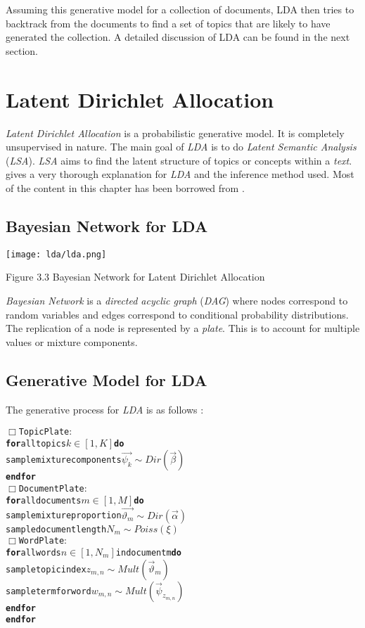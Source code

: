 Assuming this generative model for a collection of documents, LDA then tries to backtrack from the documents to find a set of 
topics that are likely to have generated the collection. A detailed discussion of LDA can be found in the next section.

\section{Latent Dirichlet Allocation}

\par

\textit{Latent Dirichlet Allocation} is a probabilistic generative model. It is completely unsupervised in nature. The main goal of 
\textit{LDA} is to do \textit{Latent Semantic Analysis} (\textit{LSA}). \textit{LSA} aims to find the latent structure of topics or 
concepts within a \textit{text}. \citep*{heinrich2005parameter} gives a very thorough explanation for \textit{LDA} and the inference 
method used. Most of the content in this chapter has been borrowed from \citep*{heinrich2005parameter}.

\subsection{Bayesian Network for LDA}

\texttt{[image: lda/lda.png]} 
\begin{center}
 Figure 3.3 Bayesian Network for Latent Dirichlet Allocation
\end{center}

\textit{Bayesian Network} is a \textit{directed acyclic graph} (\textit{DAG}) where nodes correspond to random variables and edges correspond
to conditional probability distributions. The replication of a node is represented by a \textit{plate}. This is to account for multiple
values or mixture components.

\subsection{Generative Model for LDA}

The generative process for \textit{LDA} is as follows \(\colon\)

\begin{alltt}
\(\Box\) Topic Plate \(\colon\)
\textbf{for} all topics \( k \in [1,K] \) \textbf{do}
  sample mixture components \( \vec{\psi_k} \sim Dir(\vec{\beta}) \)
\textbf{end for}
\(\Box\) Document Plate \(\colon\)
\textbf{for} all documents \( m \in [1,M] \) \textbf{do}
  sample mixture proportion \( \vec{\vartheta_m} \sim Dir(\vec{\alpha}) \)
  sample document length \( N_m \sim Poiss(\xi)\)
  \(\Box\) Word Plate \(\colon\)
  \textbf{for} all words \( n \in [1,N_m] \) in document m \textbf{do}
    sample topic index \( z_{m,n} \sim Mult(\vec{\vartheta}_m) \)
    sample term for word \( w_{m,n} \sim Mult(\vec{\psi}_{z_{m,n}}) \)
  \textbf{end for}
\textbf{end for}
\end{alltt}

